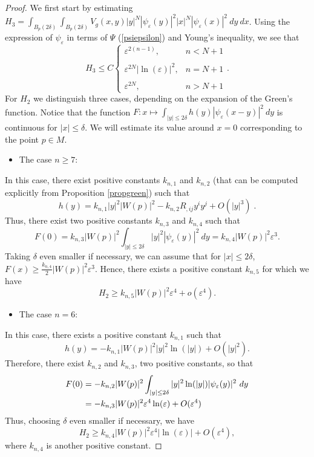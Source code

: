 \documentclass[11pt]{article}
\begin{document}
{\begin{proof}
\noindent
We first start by estimating $H_{3}=\int_{B_{p}(2\delta)}\int_{B_{p}(2\delta)}V_{g}(x,y)|y|^{N}|\psi_{\varepsilon}(y)|^{2}|x|^{N}|\psi_{\varepsilon}(x)|^{2}\ dy \ dx$. Using the expression of $\psi_{\varepsilon}$ in terms of $\Psi$ (\ref{psiepsilon}) and Young's inequality, we see that
$$H_{3}\leq C\left\{ \begin{array}{ll}
\varepsilon^{2(n-1)}, & n<N+1\\
\\
\varepsilon^{2N}|\ln(\varepsilon)|^{2}, & n=N+1\\
\\
\varepsilon^{2N}, & n>N+1
\end{array}
\right..$$
For $H_{2}$ we distinguish three cases, depending on the expansion of the Green's function. Notice that the function $F:x\mapsto \int_{|y|\leq 2\delta}h(y)|\psi_{\varepsilon}(x-y)|^{2}\ dy$ is continuous  for $|x|\leq \delta$. We will estimate its value around $x=0$ corresponding to the point $p\in M$.
\begin{itemize}
\item The case $n\geq 7$:
\end{itemize}
In this case, there exist positive constants $k_{n,1}$ and $k_{n,2}$ (that can be computed explicitly from Proposition \ref{propgreen}) such that 
$$h(y)=k_{n,1}|y|^{2}|W(p)|^{2}-k_{n,2}R_{,ij}y^{i}y^{j}+O(|y|^{3}) \; .$$
Thus, there exist two positive constants $k_{n,3}$ and $k_{n,4}$ such that
$$ F(0)=k_{n,3}|W(p)|^{2}\int_{|y|\leq 2\delta}|y|^{2}|\psi_{\varepsilon}(y)|^{2}\ dy=k_{n,4}|W(p)|^{2}\varepsilon^{3}.$$
Taking $\delta$ even smaller if necessary, we can assume that for $|x|\leq 2\delta$, $F(x)\geq \frac{k_{n,4}}{2}|W(p)|^{2}\varepsilon^{3}$. Hence, there exists a positive constant $k_{n,5}$ for which we have
$$H_{2}\geq k_{n,5}|W(p)|^{2}\varepsilon^{4}+o(\varepsilon^{4}).$$

\begin{itemize}
\item The case $n=6$:
\end{itemize}
In this case, there exists a positive constant $k_{n,1}$ such that
$$h(y)=-k_{n,1}|W(p)|^{2}|y|^{2}\ln(|y|)+O(|y|^{2}).$$
Therefore, there exist $k_{n,2}$ and $k_{n,3}$, two positive constants, so that
\begin{align}
F(0)&=-k_{n,2}|W(p)|^{2}\int_{|y|\leq 2\delta}|y|^{2}\ln(|y|)|\psi_{\varepsilon}(y)|^{2}\ dy\notag\\
&=-k_{n,3}|W(p)|^{2}\varepsilon^{4}\ln(\varepsilon)+O(\varepsilon^{4})\notag
\end{align}
Thus, choosing $\delta$ even smaller if necessary, we have 
$$H_{2}\geq k_{n,4}|W(p)|^{2}\varepsilon^{4}|\ln(\varepsilon)|+O(\varepsilon^{4}),$$
where $k_{n,4}$ is another positive constant.


\end{proof}}
\end{document}
